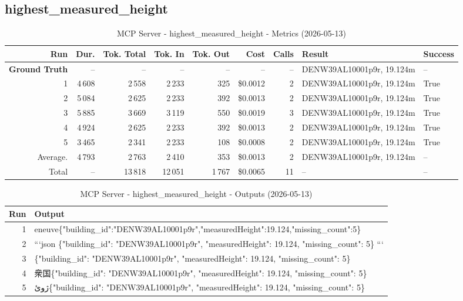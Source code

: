 \documentclass[a4paper,11pt]{article}
\begin{document}
\clearpage
\subsection{highest\_measured\_height}

\begin{table}[ht]
\centering
\scriptsize
\caption{MCP Server - highest\_measured\_height - Metrics (2026-05-13)}
\label{tab:mcp\_highest\_measured\_height\_metrics\_2026-05-13}
\begin{tabular}{r r r r r r r p{3cm} l}
\hline
Run & Dur. & Tok. Total & Tok. In & Tok. Out & Cost & Calls & Result & Success \\
\hline
\textbf{Ground Truth} & -- & -- & -- & -- & -- & -- & DENW39AL10001p9r, 19.124m & -- \\
\hline
1 & 4\,608 & 2\,558 & 2\,233 & 325 & \$0.0012 & 2 & DENW39AL10001p9r, 19.124m & True \\
2 & 5\,084 & 2\,625 & 2\,233 & 392 & \$0.0013 & 2 & DENW39AL10001p9r, 19.124m & True \\
3 & 5\,885 & 3\,669 & 3\,119 & 550 & \$0.0019 & 3 & DENW39AL10001p9r, 19.124m & True \\
4 & 4\,924 & 2\,625 & 2\,233 & 392 & \$0.0013 & 2 & DENW39AL10001p9r, 19.124m & True \\
5 & 3\,465 & 2\,341 & 2\,233 & 108 & \$0.0008 & 2 & DENW39AL10001p9r, 19.124m & True \\
\hline
Average. & 4\,793 & 2\,763 & 2\,410 & 353 & \$0.0013 & 2 & DENW39AL10001p9r, 19.124m & -- \\
Total & -- & 13\,818 & 12\,051 & 1\,767 & \$0.0065 & 11 & -- & -- \\
\hline
\end{tabular}
\end{table}

\clearpage

\begin{table}[ht]
\centering
\scriptsize
\caption{MCP Server - highest\_measured\_height - Outputs (2026-05-13)}
\label{tab:mcp\_highest\_measured\_height\_outputs\_2026-05-13}
\begin{tabular}{r p{12cm}}
\hline
Run & Output \\
\hline
1 & eneuve\{"building\_id":"DENW39AL10001p9r","measuredHeight":19.124,"missing\_count":5\} \\
2 & ```json
\{"building\_id": "DENW39AL10001p9r", "measuredHeight": 19.124, "missing\_count": 5\}
``` \\
3 & \{"building\_id": "DENW39AL10001p9r", "measuredHeight": 19.124, "missing\_count": 5\} \\
4 & 衆国\{"building\_id": "DENW39AL10001p9r", "measuredHeight": 19.124, "missing\_count": 5\} \\
5 &  ژوئ\{"building\_id": "DENW39AL10001p9r", "measuredHeight": 19.124, "missing\_count": 5\} \\
\hline
\end{tabular}
\end{table}
\end{document}
